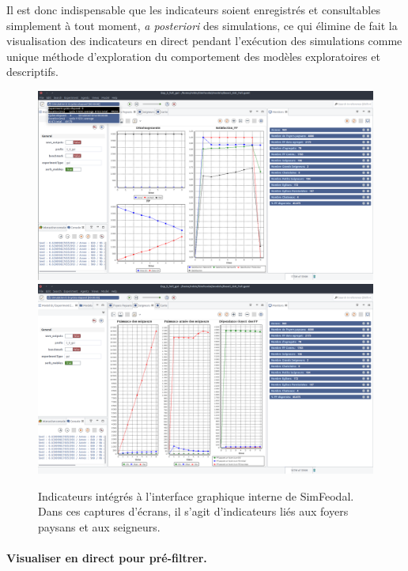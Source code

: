 Il est donc indispensable que les indicateurs soient enregistrés et consultables simplement à tout moment, \textit{a posteriori} des simulations, ce qui élimine de fait la visualisation des indicateurs en direct pendant l'exécution des simulations comme unique méthode d'exploration du comportement des modèles exploratoires et descriptifs.


\begin{figure}[H]
	\captionsetup{width=\linewidth}
	\includegraphics[width=\linewidth]{img/SimFeodal_GUI_FP.png}
	\includegraphics[width=\linewidth]{img/SimFeodal_GUI_seigneurs.png}
	\caption{Indicateurs intégrés à l'interface graphique interne de SimFeodal.
		Dans ces captures d'écrans, il s'agit d'indicateurs liés aux foyers paysans et aux seigneurs.}
	\label{fig:simfeodal_gui_indicateurs}
\end{figure}

\paragraph{Visualiser en direct pour pré-filtrer.}

